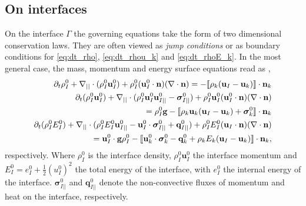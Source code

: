 \subsection{On interfaces}

On the interface $\Gamma$ the governing equations take the form of two dimensional conservation laws. 
They are often viewed as \textit{jump conditions} or as boundary conditions for  \ref{eq:dt_rho}, \ref{eq:dt_rhou_k} and \ref{eq:dt_rhoE_k}. 
In the most general case, the mass, momentum and energy surface equations read as \citep{ishii2010thermo,morel2015mathematical,bothe2022sharp}, 
\begin{align}
    \label{eq:dt_rhoI}
    \partial_t \rho_I^0
    + \mathbf{\nabla}_{||}\cdot (\rho_I^0\textbf{u}_{I}^0)
    + \rho_I^0 (\textbf{u}_I^0 \cdot \textbf{n})(\mathbf{\nabla}\cdot \textbf{n})
    = 
    -\llbracket 
        \rho_k (\textbf{u}_I - \textbf{u}_k)
     \rrbracket \cdot \textbf{n}_k
    \\
    \partial_t (\rho_I^0\textbf{u}_I^0)  
    + \mathbf{\nabla}_{||}\cdot (
        \rho_I^0\textbf{u}_{I}^0\textbf{u}_{I||}^0
        - \bm{\sigma}_{I||}^0)
        + \rho_I^0 \textbf{u}_I^0 (\textbf{u}_I^0 \cdot \textbf{n})(\mathbf{\nabla}\cdot \textbf{n}) \nonumber\\
    = 
    \rho_I^0 \textbf{g} 
    - \llbracket 
        \rho_k \textbf{u}_k (\textbf{u}_I - \textbf{u}_k)
        + \bm\sigma^0_k
     \rrbracket \cdot \textbf{n}_k
    \\
    \label{eq:dt_rhoIE_I}
    \partial_t (\rho_I^0E_I^0)  
    + \mathbf{\nabla}_{||}\cdot (
        \rho_I^0 E_I^0\textbf{u}_{I||}^0
        - \textbf{u}_I^0 \cdot \bm{\sigma}_{I||}^0 
        + \textbf{q}_{I||}^0
        )
    + \rho_I^0E_I^0  (\textbf{u}_I \cdot \textbf{n})(\mathbf{\nabla}\cdot \textbf{n})\nonumber\\
    = 
    \textbf{u}_I^0 \cdot \textbf{g}  \rho_I^0 
    - \llbracket \textbf{u}_k^0 \cdot \bm{\sigma}_k^0 - \textbf{q}_k^0
    + \rho_k E_k (\textbf{u}_I - \textbf{u}_k)
     \rrbracket \cdot \textbf{n}_k,
\end{align} 
respectively.
Where $\rho_I^0$ is the interface density, $\rho_I^0\textbf{u}_I^0$ the interface momentum 
and $E_I^0 = e_I^0 + \frac{1}{2}(u_I^0)^2$ the total energy of the interface, with $e_I^0$ the internal energy of the interface.
$\bm{\sigma}_{I||}^0$ and $\textbf{q}_{I||}^0$ denote the non-convective fluxes of momentum and heat on the interface, respectively.


